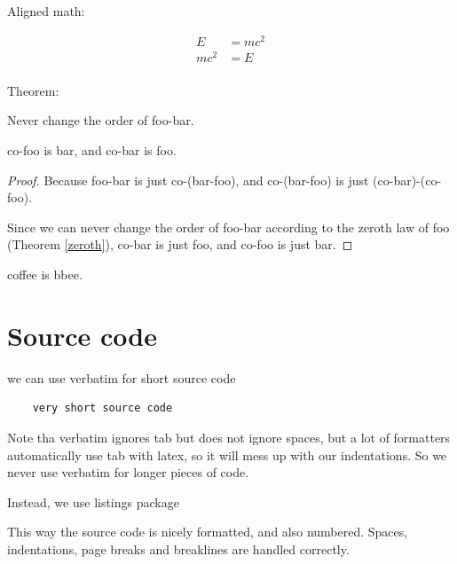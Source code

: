 \documentclass{book}
\begin{document}
Aligned math:

\begin{equation}
	\begin{aligned}
		E    & = mc^2 \\
		mc^2 & = E    \\
	\end{aligned}
\end{equation}

Theorem:

\begin{theorem}
	\label{zeroth}
	Never change the order of foo-bar.
\end{theorem}

\begin{theorem}
	co-foo is bar, and co-bar is foo.
\end{theorem}

\begin{proof}
	Because foo-bar is just co-(bar-foo), and co-(bar-foo) is just (co-bar)-(co-foo).

	Since we can never change the order of foo-bar according to the zeroth law of foo (Theorem \ref{zeroth}), co-bar is just foo, and co-foo is just bar.
\end{proof}

\begin{lemma}
	coffee is bbee.
\end{lemma}

\section{Source code}

we can use verbatim for short source code

\begin{verbatim}
    very short source code
\end{verbatim}

Note tha verbatim ignores tab but does not ignore spaces, but a lot of formatters automatically use tab with latex, so it will mess up with our indentations.
So we never use verbatim for longer pieces of code.

Instead, we use listings package



This way the source code is nicely formatted, and also numbered.
Spaces, indentations, page breaks and breaklines are handled correctly.
\end{document}
